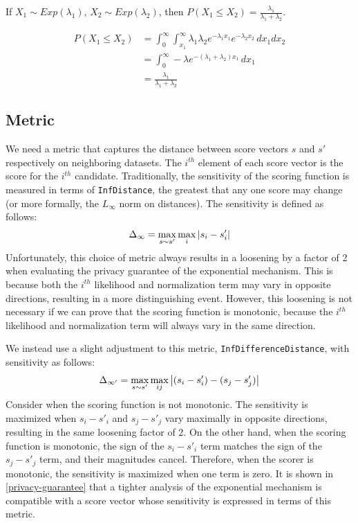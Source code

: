 \documentclass{article}
\begin{document}
\begin{lemma}
\label{exp-comp}
If $X_1 \sim Exp(\lambda_1)$, $X_2 \sim Exp(\lambda_2)$, then $P(X_1 \leq X_2) = \frac{\lambda_1}{\lambda_1 + \lambda_2}$.

\begin{align*}
    P(X_1 \leq X_2) &= \int_0^\infty \int_{x_1}^\infty \lambda_1 \lambda_2 e^{-\lambda_1 x_1} e^{-\lambda_2 x_2} \,dx_1 dx_2 \\
    &= \int_0^\infty -\lambda e^{-(\lambda_1 + \lambda_2) x_1} \,dx_1 \\
    &= \frac{\lambda_1}{\lambda_1 + \lambda_2}
\end{align*}

\end{lemma}


\subsection{Metric}
We need a metric that captures the distance between score vectors $s$ and $s'$ respectively on neighboring datasets. 
The $i^{th}$ element of each score vector is the score for the $i^{th}$ candidate.
Traditionally, the sensitivity of the scoring function is measured in terms of \texttt{InfDistance}, 
the greatest that any one score may change (or more formally, the $L_\infty$ norm on distances).
The sensitivity is defined as follows:
\begin{equation}
    \Delta_{\infty} = \max\limits_{s \sim s'} \max\limits_{i} \abs{s_i - s'_i}
\end{equation}
Unfortunately, this choice of metric always results in a loosening by a factor of 2 when evaluating the privacy guarantee of the exponential mechanism.
This is because both the $i^{th}$ likelihood and normalization term may vary in opposite directions, resulting in a more distinguishing event.
However, this loosening is not necessary if we can prove that the scoring function is monotonic, because the $i^{th}$ likelihood and normalization term will always vary in the same direction.

We instead use a slight adjustment to this metric, \texttt{InfDifferenceDistance}, with sensitivity as follows:
\begin{equation}
    \Delta_{\infty'} = \max\limits_{s \sim s'} \max\limits_{ij} \abs{(s_i - s'_i) - (s_j - s'_j)}
\end{equation}
Consider when the scoring function is not monotonic.
The sensitivity is maximized when $s_i - s'_i$ and $s_j - s'_j$ vary maximally in opposite directions, resulting in the same loosening factor of 2.
On the other hand, when the scoring function is monotonic, the sign of the $s_i - s'_i$ term matches the sign of the $s_j - s'_j$ term,
and their magnitudes cancel.
Therefore, when the scorer is monotonic, the sensitivity is maximized when one term is zero. 
It is shown in \ref{privacy-guarantee} that a tighter analysis of the exponential mechanism is compatible with a score vector whose sensitivity is expressed in terms of this metric.
\end{document}
